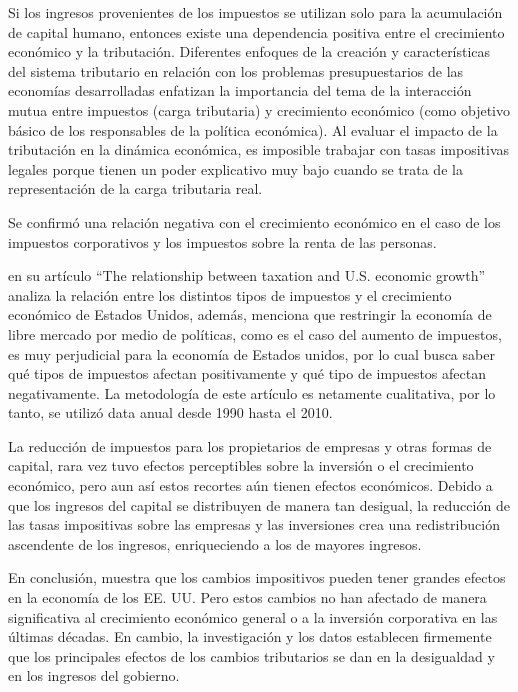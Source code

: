 \documentclass[
  letterpaper,
]{article}
\begin{document}
Si los ingresos provenientes de los impuestos se utilizan solo para la
acumulación de capital humano, entonces existe una dependencia positiva
entre el crecimiento económico y la tributación. Diferentes enfoques de
la creación y características del sistema tributario en relación con los
problemas presupuestarios de las economías desarrolladas enfatizan la
importancia del tema de la interacción mutua entre impuestos (carga
tributaria) y crecimiento económico (como objetivo básico de los
responsables de la política económica). Al evaluar el impacto de la
tributación en la dinámica económica, es imposible trabajar con tasas
impositivas legales porque tienen un poder explicativo muy bajo cuando
se trata de la representación de la carga tributaria real.

Se confirmó una relación negativa con el crecimiento económico en el
caso de los impuestos corporativos y los impuestos sobre la renta de las
personas.

\textcite{husak_relationship_2021} en su artículo ``The relationship
between taxation and U.S. economic growth'' analiza la relación entre
los distintos tipos de impuestos y el crecimiento económico de Estados
Unidos, además, menciona que restringir la economía de libre mercado por
medio de políticas, como es el caso del aumento de impuestos, es muy
perjudicial para la economía de Estados unidos, por lo cual busca saber
qué tipos de impuestos afectan positivamente y qué tipo de impuestos
afectan negativamente. La metodología de este artículo es netamente
cualitativa, por lo tanto, se utilizó data anual desde 1990 hasta el
2010.

La reducción de impuestos para los propietarios de empresas y otras
formas de capital, rara vez tuvo efectos perceptibles sobre la inversión
o el crecimiento económico, pero aun así estos recortes aún tienen
efectos económicos. Debido a que los ingresos del capital se distribuyen
de manera tan desigual, la reducción de las tasas impositivas sobre las
empresas y las inversiones crea una redistribución ascendente de los
ingresos, enriqueciendo a los de mayores ingresos.

En conclusión, muestra que los cambios impositivos pueden tener grandes
efectos en la economía de los EE. UU. Pero estos cambios no han afectado
de manera significativa al crecimiento económico general o a la
inversión corporativa en las últimas décadas. En cambio, la
investigación y los datos establecen firmemente que los principales
efectos de los cambios tributarios se dan en la desigualdad y en los
ingresos del gobierno.
\end{document}
